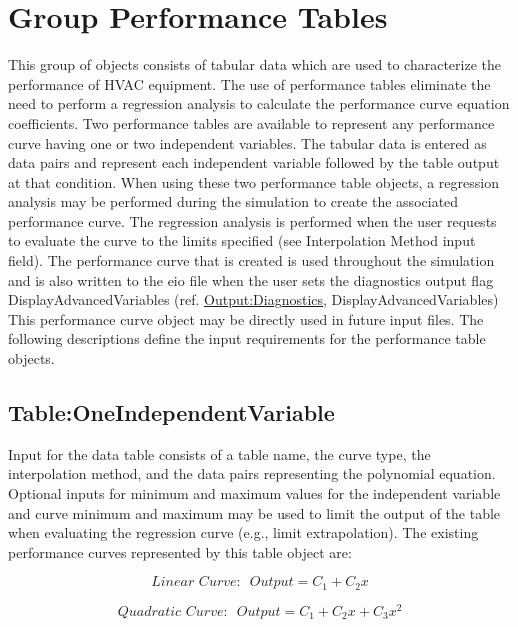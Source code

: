 \section{Group Performance Tables}\label{group-performance-tables}

This group of objects consists of tabular data which are used to characterize the performance of HVAC equipment. The use of performance tables eliminate the need to perform a regression analysis to calculate the performance curve equation coefficients. Two performance tables are available to represent any performance curve having one or two independent variables. The tabular data is entered as data pairs and represent each independent variable followed by the table output at that condition. When using these two performance table objects, a regression analysis may be performed during the simulation to create the associated performance curve. The regression analysis is performed when the user requests to evaluate the curve to the limits specified (see Interpolation Method input field). The performance curve that is created is used throughout the simulation and is also written to the eio file when the user sets the diagnostics output flag DisplayAdvancedVariables (ref. \hyperref[outputdiagnostics]{Output:Diagnostics}, DisplayAdvancedVariables) This performance curve object may be directly used in future input files. The following descriptions define the input requirements for the performance table objects.

\subsection{Table:OneIndependentVariable}\label{tableoneindependentvariable}

Input for the data table consists of a table name, the curve type, the interpolation method, and the data pairs representing the polynomial equation. Optional inputs for minimum and maximum values for the independent variable and curve minimum and maximum may be used to limit the output of the table when evaluating the regression curve (e.g., limit extrapolation). The existing performance curves represented by this table object are:

\begin{equation}
Linear\,\,Curve:\,\,\,Output = {C_1} + {C_2}x
\end{equation}

\begin{equation}
Quadratic\,\,Curve:\,\,\,Output = {C_1} + {C_2}x + {C_3}{x^2}
\end{equation}

